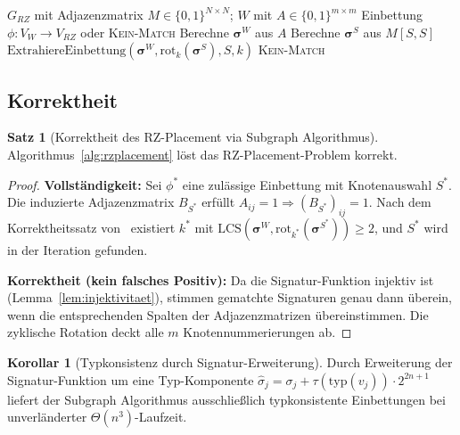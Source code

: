 ﻿\documentclass[a4paper,12pt]{article}
\theoremstyle{definition}
\newtheorem{satz}{Satz}
\newtheorem{korollar}{Korollar}
\begin{document}
\begin{algorithm}[H]
\caption{RZ-Workload-Placement via Subgraph Algorithmus}
\label{alg:rzplacement}
\begin{algorithmic}[1]
\Require $G_{RZ}$ mit Adjazenzmatrix $M \in \{0,1\}^{N\times N}$; $W$ mit $A \in \{0,1\}^{m\times m}$
\Ensure Einbettung $\phi: V_W \to V_{RZ}$ oder \textsc{Kein-Match}
\State Berechne $\boldsymbol{\sigma}^W$ aus $A$
  \State Berechne $\boldsymbol{\sigma}^S$ aus $M[S,S]$
      \State \Return $\mathrm{ExtrahiereEinbettung}(\boldsymbol{\sigma}^W, \mathrm{rot}_k(\boldsymbol{\sigma}^S), S, k)$
    \EndIf
  \EndFor
\EndFor
\State \Return \textsc{Kein-Match}
\end{algorithmic}
\end{algorithm}

\subsection{Korrektheit}

\begin{satz}[Korrektheit des RZ-Placement via Subgraph Algorithmus]
  \label{satz:korrektheit}
  Algorithmus~\ref{alg:rzplacement} l\"{o}st das RZ-Placement-Problem korrekt.
\end{satz}

\begin{proof}
  \textbf{Vollst\"{a}ndigkeit:} Sei $\phi^*$ eine zul\"{a}ssige Einbettung mit Knotenauswahl $S^*$. Die induzierte Adjazenzmatrix $B_{S^*}$ erf\"{u}llt $A_{ij} = 1 \Rightarrow (B_{S^*})_{ij} = 1$.
  Nach dem Korrektheitssatz von~\cite{epp2026subgraph} existiert $k^*$ mit $\mathrm{LCS}(\boldsymbol{\sigma}^W, \mathrm{rot}_{k^*}(\boldsymbol{\sigma}^{S^*})) \geq 2$, und $S^*$ wird in der Iteration gefunden.

  \textbf{Korrektheit (kein falsches Positiv):} Da die Signatur-Funktion injektiv ist (Lemma~\ref{lem:injektivitaet}), stimmen gematchte Signaturen genau dann \"{u}berein, wenn die entsprechenden Spalten der Adjazenzmatrizen \"{u}bereinstimmen. Die zyklische Rotation deckt alle $m$ Knotennummerierungen ab.
\end{proof}

\begin{korollar}[Typkonsistenz durch Signatur-Erweiterung]
  \label{kor:typ}
  Durch Erweiterung der Signatur-Funktion um eine Typ-Komponente
  $\hat{\sigma}_j = \sigma_j + \tau(\mathrm{typ}(v_j)) \cdot 2^{2n+1}$
  liefert der Subgraph Algorithmus ausschlie{\ss}lich typkonsistente Einbettungen bei unverl\"{a}nderter $\Theta(n^3)$-Laufzeit.
\end{korollar}
\end{document}
